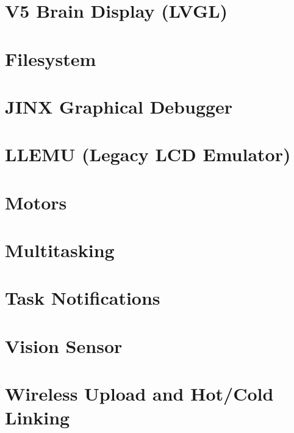 \let\mypdfximage\pdfximage\def\pdfximage{\immediate\mypdfximage}\documentclass[twoside]{book}
\newcommand{\+}{\discretionary{\mbox{\scriptsize$\hookleftarrow$}}{}{}}
\begin{document}
\chapter{V5 Brain Display (L\+V\+GL)}
\label{md_docs_tutorials_topical_display}

\chapter{Filesystem}
\label{md_docs_tutorials_topical_filesystem}

\chapter{J\+I\+NX Graphical Debugger}
\label{md_docs_tutorials_topical_jinx}

\chapter{L\+L\+E\+MU (Legacy L\+CD Emulator)}
\label{md_docs_tutorials_topical_llemu}

\chapter{Motors}
\label{md_docs_tutorials_topical_motors}

\chapter{Multitasking}
\label{md_docs_tutorials_topical_multitasking}

\chapter{Task Notifications}
\label{md_docs_tutorials_topical_notifications}

\chapter{Vision Sensor}
\label{md_docs_tutorials_topical_vision}

\chapter{Wireless Upload and Hot/\+Cold Linking}
\label{md_docs_tutorials_topical_wireless-upload}

\end{document}
